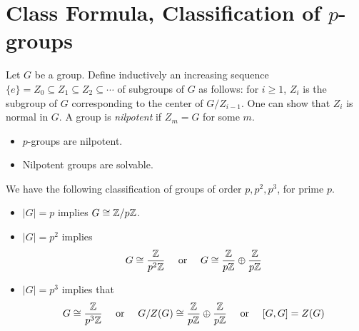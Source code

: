 \section{Class Formula, Classification of $p$-groups}
\begin{defn}
    Let $G$ be a group. Define inductively an increasing sequence 
$\{e\}=Z_0 \subseteq Z_1 \subseteq Z_2 \subseteq \cdots$ of subgroups of $G$ 
as follows: for $i \geq 1$, $Z_i$ is the subgroup of $G$ corresponding 
to the center of $G/Z_{i-1}$. One can show that $Z_i$ is normal in $G$. A group is \emph{nilpotent} if $Z_m = G$ for some $m$.
\end{defn}
\begin{example}
    \phantom{text}
    \begin{itemize}
        \item $p$-groups are nilpotent.
        \item Nilpotent groups are solvable.
    \end{itemize}
\end{example}
\begin{prop}
    We have the following classification of groups of order $p, p^2, p^3$, for prime $p$.
    \begin{itemize}
        \item $|G|=p$ implies $G\cong\mathbb{Z}/p\mathbb{Z}$.
        \item $|G|=p^2$ implies 
        \begin{equation*}
            G\cong\frac{\mathbb{Z}}{p^2\mathbb{Z}} \quad\text{ or }\quad G\cong\frac{\mathbb{Z}}{p\mathbb{Z}}\oplus\frac{\mathbb{Z}}{p\mathbb{Z}}
        \end{equation*}
        \item $|G|=p^3$ implies that 
        \begin{equation*}
            G\cong\frac{\mathbb{Z}}{p^3\mathbb{Z}} \quad \text{ or } \quad G/Z(G)\cong\frac{\mathbb{Z}}{p\mathbb{Z}}\oplus\frac{\mathbb{Z}}{p\mathbb{Z}} \quad\text{ or }\quad [G,G]=Z(G)
        \end{equation*}
    \end{itemize}
\end{prop}

